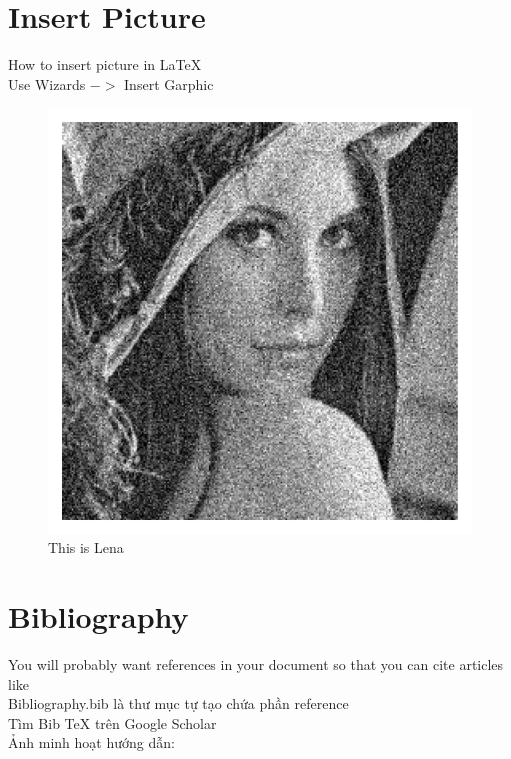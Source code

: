 \documentclass[a4paper]{article}
\begin{document}
\section{Insert Picture} %
How to insert picture in \LaTeX \\
Use Wizards $->$ Insert Garphic
\begin{figure}[tph]
\centering
\includegraphics[width=0.7\linewidth]{lena}
\caption{This is Lena}
\end{figure}

\section{Bibliography} %
You will probably want references in your document so that you can cite articles like \cite{gratzer2007more}\\
Bibliography.bib là thư mục tự tạo chứa phần reference\\
Tìm Bib TeX trên Google Scholar\\
Ảnh minh hoạt hướng dẫn:\\
\end{document}
